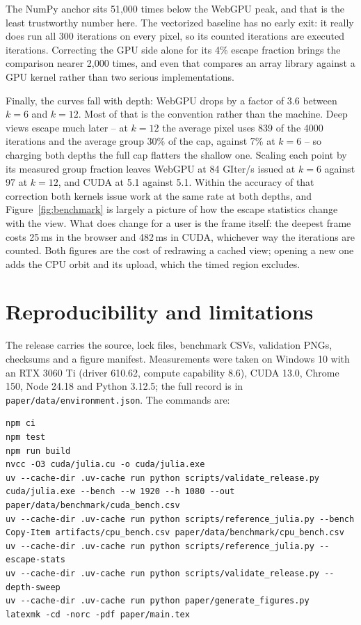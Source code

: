 \documentclass[10pt,a4paper]{article}
\begin{document}
The NumPy anchor sits 51,000 times below the WebGPU peak, and that is the
least trustworthy number here. The vectorized baseline has no early exit: it
really does run all 300 iterations on every pixel, so its counted iterations
are executed iterations. Correcting the GPU side alone for its 4\% escape
fraction brings the comparison nearer 2,000 times, and even that compares an
array library against a GPU kernel rather than two serious implementations.

Finally, the curves fall with depth: WebGPU drops by a factor of 3.6 between
\(k=6\) and \(k=12\). Most of that is the convention rather than the machine.
Deep views escape much later -- at \(k=12\) the average pixel uses 839 of the
4000 iterations and the average group 30\% of the cap, against 7\% at \(k=6\)
-- so charging both depths the full cap flatters the shallow one. Scaling each
point by its measured group fraction leaves WebGPU at 84 GIter/s issued at
\(k=6\) against 97 at \(k=12\), and CUDA at 5.1 against 5.1. Within the
accuracy of that correction both kernels issue work at the same rate at both
depths, and Figure~\ref{fig:benchmark} is largely a picture of how the escape
statistics change with the view. What does change for a user is the frame
itself: the deepest frame costs 25\,ms in the browser and 482\,ms in CUDA,
whichever way the iterations are counted. Both figures are the cost of
redrawing a cached view; opening a new one adds the CPU orbit and its upload,
which the timed region excludes.

\section{Reproducibility and limitations}

The release carries the source, lock files, benchmark CSVs, validation PNGs,
checksums and a figure manifest. Measurements were taken on Windows 10 with an
RTX 3060 Ti (driver 610.62, compute capability 8.6), CUDA 13.0, Chrome 150,
Node 24.18 and Python 3.12.5; the full record is in
\texttt{paper/data/environment.json}. The commands are:

\begin{lstlisting}
npm ci
npm test
npm run build
nvcc -O3 cuda/julia.cu -o cuda/julia.exe
uv --cache-dir .uv-cache run python scripts/validate_release.py
cuda/julia.exe --bench --w 1920 --h 1080 --out paper/data/benchmark/cuda_bench.csv
uv --cache-dir .uv-cache run python scripts/reference_julia.py --bench
Copy-Item artifacts/cpu_bench.csv paper/data/benchmark/cpu_bench.csv
uv --cache-dir .uv-cache run python scripts/reference_julia.py --escape-stats
uv --cache-dir .uv-cache run python scripts/validate_release.py --depth-sweep
uv --cache-dir .uv-cache run python paper/generate_figures.py
latexmk -cd -norc -pdf paper/main.tex
\end{lstlisting}
\end{document}
